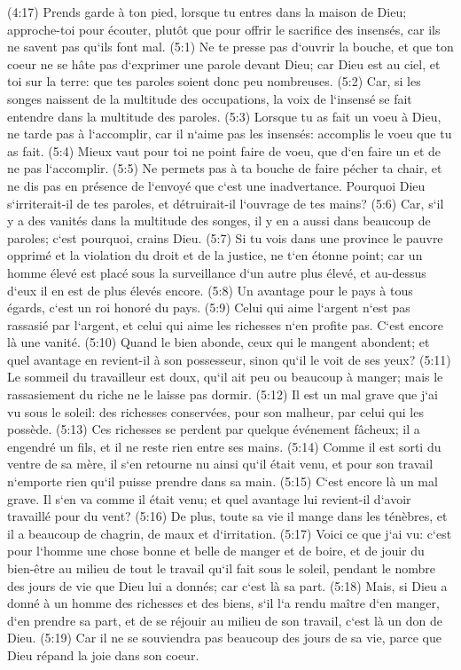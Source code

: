 \verse (4:17) Prends garde à ton pied, lorsque tu entres dans la maison de Dieu; approche-toi pour écouter, plutôt que pour offrir le sacrifice des insensés, car ils ne savent pas qu`ils font mal. 
\verse (5:1) Ne te presse pas d`ouvrir la bouche, et que ton coeur ne se hâte pas d`exprimer une parole devant Dieu; car Dieu est au ciel, et toi sur la terre: que tes paroles soient donc peu nombreuses. 
\verse (5:2) Car, si les songes naissent de la multitude des occupations, la voix de l`insensé se fait entendre dans la multitude des paroles. 
\verse (5:3) Lorsque tu as fait un voeu à Dieu, ne tarde pas à l`accomplir, car il n`aime pas les insensés: accomplis le voeu que tu as fait. 
\verse (5:4) Mieux vaut pour toi ne point faire de voeu, que d`en faire un et de ne pas l`accomplir. 
\verse (5:5) Ne permets pas à ta bouche de faire pécher ta chair, et ne dis pas en présence de l`envoyé que c`est une inadvertance. Pourquoi Dieu s`irriterait-il de tes paroles, et détruirait-il l`ouvrage de tes mains? 
\verse (5:6) Car, s`il y a des vanités dans la multitude des songes, il y en a aussi dans beaucoup de paroles; c`est pourquoi, crains Dieu. 
\verse (5:7) Si tu vois dans une province le pauvre opprimé et la violation du droit et de la justice, ne t`en étonne point; car un homme élevé est placé sous la surveillance d`un autre plus élevé, et au-dessus d`eux il en est de plus élevés encore. 
\verse (5:8) Un avantage pour le pays à tous égards, c`est un roi honoré du pays. 
\verse (5:9) Celui qui aime l`argent n`est pas rassasié par l`argent, et celui qui aime les richesses n`en profite pas. C`est encore là une vanité. 
\verse (5:10) Quand le bien abonde, ceux qui le mangent abondent; et quel avantage en revient-il à son possesseur, sinon qu`il le voit de ses yeux? 
\verse (5:11) Le sommeil du travailleur est doux, qu`il ait peu ou beaucoup à manger; mais le rassasiement du riche ne le laisse pas dormir. 
\verse (5:12) Il est un mal grave que j`ai vu sous le soleil: des richesses conservées, pour son malheur, par celui qui les possède. 
\verse (5:13) Ces richesses se perdent par quelque événement fâcheux; il a engendré un fils, et il ne reste rien entre ses mains. 
\verse (5:14) Comme il est sorti du ventre de sa mère, il s`en retourne nu ainsi qu`il était venu, et pour son travail n`emporte rien qu`il puisse prendre dans sa main. 
\verse (5:15) C`est encore là un mal grave. Il s`en va comme il était venu; et quel avantage lui revient-il d`avoir travaillé pour du vent? 
\verse (5:16) De plus, toute sa vie il mange dans les ténèbres, et il a beaucoup de chagrin, de maux et d`irritation. 
\verse (5:17) Voici ce que j`ai vu: c`est pour l`homme une chose bonne et belle de manger et de boire, et de jouir du bien-être au milieu de tout le travail qu`il fait sous le soleil, pendant le nombre des jours de vie que Dieu lui a donnés; car c`est là sa part. 
\verse (5:18) Mais, si Dieu a donné à un homme des richesses et des biens, s`il l`a rendu maître d`en manger, d`en prendre sa part, et de se réjouir au milieu de son travail, c`est là un don de Dieu. 
\verse (5:19) Car il ne se souviendra pas beaucoup des jours de sa vie, parce que Dieu répand la joie dans son coeur. 

